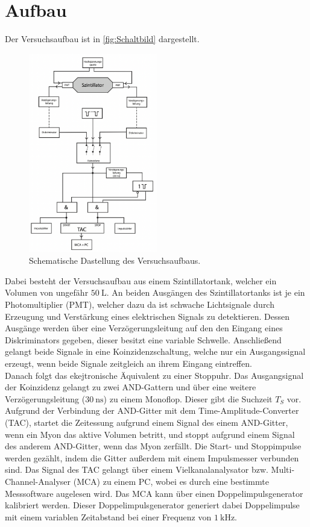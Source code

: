 \section{Aufbau}
\label{sec:Aufbau}
Der Versuchsaufbau ist in \autoref{fig:Schaltbild} dargestellt. 
\begin{figure}[H]
    \centering
    \includegraphics[width=0.5\textwidth]{Abbildungen/Schaltung.png}
    \caption {Schematische Dastellung des Versuchsaufbaus.\cite{V01}}
    \label{fig:Schaltbild}
\end{figure}
Dabei besteht der Versuchsaufbau aus einem Szintillatortank, welcher ein Volumen von ungefähr $\qty{50}{\liter}$.
An beiden Ausgängen des Szintillatortanks ist je ein Photomultiplier (PMT), welcher dazu da ist schwache Lichtsignale durch Erzeugung und Verstärkung eines elektrischen Signals zu detektieren.
Dessen Ausgänge werden über eine Verzögerungsleitung auf den den Eingang eines Diskriminators gegeben, dieser besitzt eine variable Schwelle. 
Anschließend gelangt beide Signale in eine Koinzidenzschaltung, welche nur ein Ausgangssignal erzeugt, wenn beide Signale zeitgleich an ihrem Eingang eintreffen.\\
Danach folgt das ekejtronische Äquivalent zu einer Stoppuhr.
Das Ausgangsignal der Koinzidenz gelangt zu zwei AND-Gattern und über eine weitere Verzögerungsleitung ($\qty{30}{\nano\second}$) zu einem Monoflop. Dieser gibt die Suchzeit $T_S$ vor.
Aufgrund der Verbindung der AND-Gitter mit dem Time-Amplitude-Converter (TAC), startet die Zeitessung aufgrund einem Signal des einem AND-Gitter,
wenn ein Myon das aktive Volumen betritt, und stoppt aufgrund einem Signal des anderem AND-Gitter, wenn das Myon zerfällt. 
Die Start- und Stoppimpulse werden gezählt, indem die Gitter außerdem mit einem Impulsmesser verbunden sind.
Das Signal des TAC gelangt über einem Vielkanalanalysator bzw. Multi-Channel-Analyser (MCA) zu einem PC, wobei es durch eine bestimmte Messsoftware augelesen wird.
Das MCA kann über einen Doppelimpulsgenerator kalibriert werden. Dieser Doppelimpulsgenerator generiert dabei Doppelimpulse mit einem variablen Zeitabstand bei einer Frequenz von $\qty{1}{\kilo\Hz}$.


